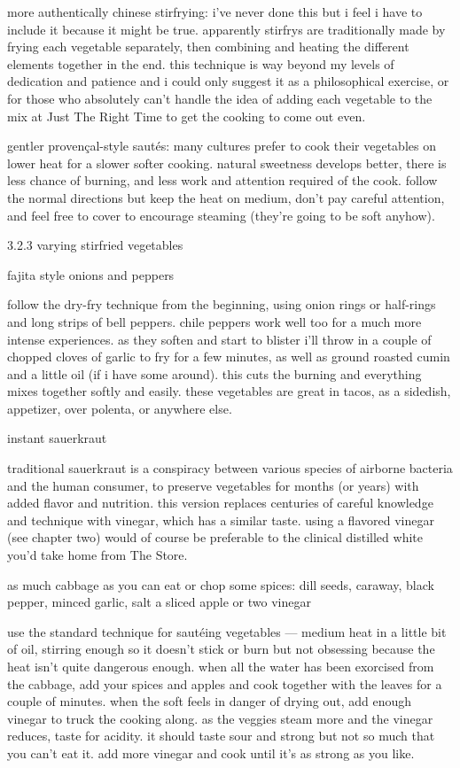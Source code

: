 more authentically chinese stirfrying:
	i've never done this but i feel i have to include it because it might be true. apparently stirfrys are traditionally made by frying each vegetable separately, then combining and heating the different elements together in the end. this technique is way beyond my levels of dedication and patience and i could only suggest it as a philosophical exercise, or for those who absolutely can't handle the idea of adding each vegetable to the mix at Just The Right Time to get the cooking to come out even.

gentler proven\c{c}al-style saut\'{e}s:
	many cultures prefer to cook their vegetables on lower heat for a slower softer cooking. natural sweetness develops better, there is less chance of burning, and less work and attention required of the cook. follow the normal directions but keep the heat on medium, don't pay careful attention, and feel free to cover to encourage steaming (they're going to be soft anyhow).

3.2.3 varying stirfried vegetables

fajita style onions and peppers	

follow the dry-fry technique from the beginning, using onion rings or half-rings and long strips of bell peppers. chile peppers work well too for a much more intense experiences. as they soften and start to blister i'll throw in a couple of chopped cloves of garlic to fry for a few minutes, as well as ground roasted cumin and a little oil (if i have some around). this cuts the burning and everything mixes together softly and easily. these vegetables are great in tacos, as a sidedish, appetizer, over polenta, or anywhere else.

instant sauerkraut

traditional sauerkraut is a conspiracy between various species of airborne bacteria and the human consumer, to preserve vegetables for months (or years) with added flavor and nutrition. this version replaces centuries of careful knowledge and technique with vinegar, which has a similar taste. using a flavored vinegar (see chapter two) would of course be preferable to the clinical distilled white you'd take home from The Store.

as much cabbage as you can eat or chop
some spices: dill seeds, caraway, black pepper, minced garlic, salt
a sliced apple or two
vinegar

use the standard technique for saut\'{e}ing vegetables --- medium heat in a little bit of oil, stirring enough so it doesn't stick or burn but not obsessing because the heat isn't quite dangerous enough. when all the water has been exorcised from the cabbage, add your spices and apples and cook together with the leaves for a couple of minutes. when the soft feels in danger of drying out, add enough vinegar to truck the cooking along. as the veggies steam more and the vinegar reduces, taste for acidity. it should taste sour and strong but not so much that you can't eat it. add more vinegar and cook until it's as strong as you like.

